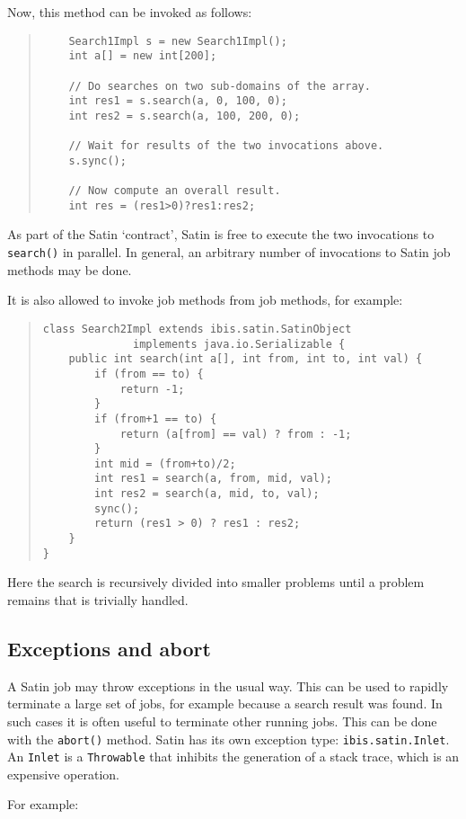 \documentclass[10pt]{article}
\newcommand{\mysubsection}[1]{\subsection{#1}\label{#1}}
\begin{document}
Now, this method can be invoked as follows:

\begin{quote}
\begin{verbatim}
    Search1Impl s = new Search1Impl();
    int a[] = new int[200];

    // Do searches on two sub-domains of the array.
    int res1 = s.search(a, 0, 100, 0);
    int res2 = s.search(a, 100, 200, 0);

    // Wait for results of the two invocations above.
    s.sync();

    // Now compute an overall result.
    int res = (res1>0)?res1:res2;
\end{verbatim}
\end{quote}

As part of the Satin `contract', Satin is free to execute the two
invocations to \verb+search()+ in parallel.
In general, an arbitrary number of
invocations to Satin job methods may be done.

It is also allowed to invoke job methods from job methods, for example:

\begin{quote}
\begin{verbatim}
class Search2Impl extends ibis.satin.SatinObject
              implements java.io.Serializable {
    public int search(int a[], int from, int to, int val) {
        if (from == to) {
            return -1;
        }
        if (from+1 == to) {
            return (a[from] == val) ? from : -1;
        }
        int mid = (from+to)/2;
        int res1 = search(a, from, mid, val);
        int res2 = search(a, mid, to, val);
        sync();
        return (res1 > 0) ? res1 : res2;
    }
}
\end{verbatim}
\end{quote}
\noindent
Here the search is recursively divided into smaller problems until
a problem remains that is trivially handled.

\mysubsection{Exceptions and abort}

A Satin job may throw exceptions in the usual way. This can be used
to rapidly terminate a large set of jobs, for example because a search
result was found. In such cases it is often useful to terminate other
running jobs.  This can be done with the \verb+abort()+ method.  Satin has
its own exception type: \verb+ibis.satin.Inlet+.  An \verb+Inlet+ is a
\verb+Throwable+ that inhibits the generation of a stack trace, which
is an expensive operation.

For example:
\end{document}
